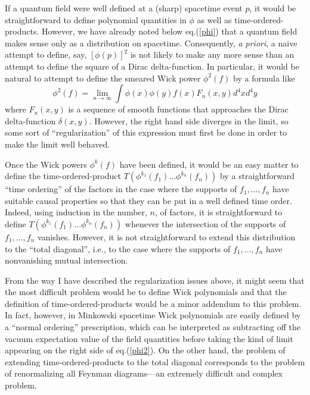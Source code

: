 \documentclass[12pt,epsf,amsfonts,amssymb]{article}
\begin{document}
If a quantum field were well defined at a (sharp) spacetime event $p$,
it would be straightforward to define polynomial quantities in $\phi$
as well as time-ordered-products. However, we have already noted below
eq.(\ref{phi}) that a quantum field makes sense only as a distribution
on spacetime. Consequently, {\it a priori}, a naive attempt to define,
say, $[\phi(p)]^2$ is not likely to make any more sense than an
attempt to define the square of a Dirac delta-function. In particular,
it would be natural to attempt to define the smeared Wick power
$\phi^2 (f)$ by a formula like
\begin{equation}
\phi^2 (f) = \lim_{n \rightarrow \infty} 
\int \phi(x) \phi(y) f(x) F_n (x,y) d^4 x d^4 y
\label{phi2}
\end{equation}
where $F_n(x,y)$ is a sequence of smooth functions that approaches the
Dirac delta-function $\delta(x,y)$. However, the right hand side
diverges in the limit, so some sort of ``regularization'' of this
expression must first be done in order to make the limit well behaved.

Once the Wick powers $\phi^k (f)$ have been defined, it would be an
easy matter to define the time-ordered-product $T(\phi^{k_1} (f_1)
\dots \phi^{k_n} (f_n))$ by a straightforward ``time ordering'' of the
factors in the case where the supports of $f_1, \dots, f_n$
have suitable causal properties so that they can be put in a well
defined time order. Indeed, using induction in the number, $n$, of
factors, it is straightforward to define $T(\phi^{k_1} (f_1) \dots
\phi^{k_n} (f_n))$ whenever the intersection of the supports of $f_1,
\dots, f_n$ vanishes. However, it is not straightforward to extend
this distribution to the ``total diagonal'', i.e., to the case where
the supports of $f_1, \dots, f_n$ have nonvanishing mutual
intersection.

From the way I have described the regularization issues above, it
might seem that the most difficult problem would be to define Wick
polynomials and that the definition of time-ordered-products would be
a minor addendum to this problem. In fact, however, in Minkowski
spacetime Wick polynomials are easily defined by a ``normal ordering''
prescription, which can be interpreted as subtracting off the vacuum
expectation value of the field quantities before taking the kind of
limit appearing on the right side of eq.(\ref{phi2}). On the other
hand, the problem of extending time-ordered-products to the total
diagonal corresponds to the problem of renormalizing all Feynman
diagrams---an extremely difficult and complex problem.
\end{document}
